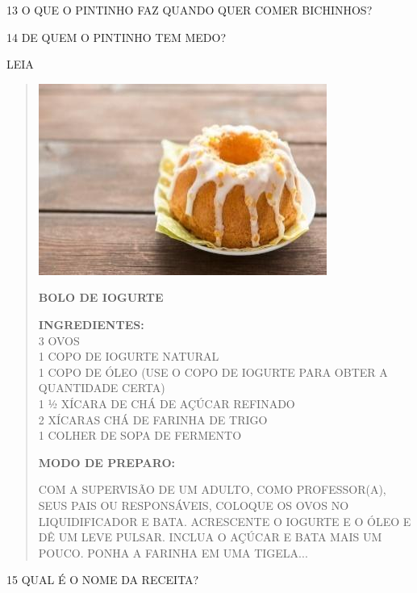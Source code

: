 \num{13} O QUE O PINTINHO FAZ QUANDO QUER COMER BICHINHOS?


\num{14} DE QUEM O PINTINHO TEM MEDO?


\pagebreak
LEIA


\begin{quote}
\includegraphics[width=.7\textwidth]{media/image130.jpg}

\textbf{BOLO DE IOGURTE}

\begin{flushleft}
\textbf{INGREDIENTES:}\\
3 OVOS\\
1 COPO DE IOGURTE NATURAL\\
1 COPO DE ÓLEO (USE O COPO DE IOGURTE PARA OBTER A QUANTIDADE CERTA)\\
1 ½ XÍCARA DE CHÁ DE AÇÚCAR REFINADO\\
2 XÍCARAS CHÁ DE FARINHA DE TRIGO\\
1 COLHER DE SOPA DE FERMENTO

\textbf{MODO DE PREPARO:}

COM A SUPERVISÃO DE UM ADULTO, COMO PROFESSOR(A), SEUS PAIS OU RESPONSÁVEIS, COLOQUE OS OVOS NO LIQUIDIFICADOR E BATA. ACRESCENTE O IOGURTE E O ÓLEO
E DÊ UM LEVE PULSAR. INCLUA O AÇÚCAR E BATA MAIS UM POUCO. PONHA A
FARINHA EM UMA TIGELA...
\end{flushleft}

\end{quote}

\num{15} QUAL É O NOME DA RECEITA?

